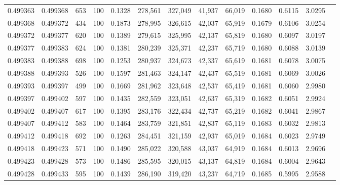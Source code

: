 \begin{tabular}{rrrrrrrrrrrrr}
0.499363 & 0.499368 &   653 & 100 &                                     0.1328 & 278,561 & 327,049 &  41,937 &  66,019 & 0.1680 & 0.6115 & 3.0295 \\
0.499368 & 0.499372 &   434 & 100 &                                     0.1873 & 278,995 & 326,615 &  42,037 &  65,919 & 0.1679 & 0.6106 & 3.0254 \\
0.499372 & 0.499377 &   620 & 100 &                                     0.1389 & 279,615 & 325,995 &  42,137 &  65,819 & 0.1680 & 0.6097 & 3.0197 \\
0.499377 & 0.499383 &   624 & 100 &                                     0.1381 & 280,239 & 325,371 &  42,237 &  65,719 & 0.1680 & 0.6088 & 3.0139 \\
0.499383 & 0.499388 &   698 & 100 &                                     0.1253 & 280,937 & 324,673 &  42,337 &  65,619 & 0.1681 & 0.6078 & 3.0075 \\
0.499388 & 0.499393 &   526 & 100 &                                     0.1597 & 281,463 & 324,147 &  42,437 &  65,519 & 0.1681 & 0.6069 & 3.0026 \\
0.499393 & 0.499397 &   499 & 100 &                                     0.1669 & 281,962 & 323,648 &  42,537 &  65,419 & 0.1681 & 0.6060 & 2.9980 \\
0.499397 & 0.499402 &   597 & 100 &                                     0.1435 & 282,559 & 323,051 &  42,637 &  65,319 & 0.1682 & 0.6051 & 2.9924 \\
0.499402 & 0.499407 &   617 & 100 &                                     0.1395 & 283,176 & 322,434 &  42,737 &  65,219 & 0.1682 & 0.6041 & 2.9867 \\
0.499407 & 0.499412 &   583 & 100 &                                     0.1464 & 283,759 & 321,851 &  42,837 &  65,119 & 0.1683 & 0.6032 & 2.9813 \\
0.499412 & 0.499418 &   692 & 100 &                                     0.1263 & 284,451 & 321,159 &  42,937 &  65,019 & 0.1684 & 0.6023 & 2.9749 \\
0.499418 & 0.499423 &   571 & 100 &                                     0.1490 & 285,022 & 320,588 &  43,037 &  64,919 & 0.1684 & 0.6013 & 2.9696 \\
0.499423 & 0.499428 &   573 & 100 &                                     0.1486 & 285,595 & 320,015 &  43,137 &  64,819 & 0.1684 & 0.6004 & 2.9643 \\
0.499428 & 0.499433 &   595 & 100 &                                     0.1439 & 286,190 & 319,420 &  43,237 &  64,719 & 0.1685 & 0.5995 & 2.9588 \\

\end{tabular}

